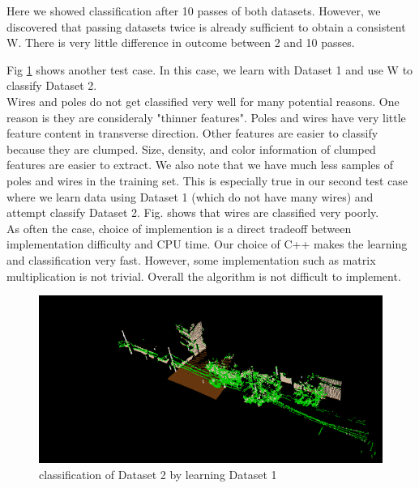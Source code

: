 \documentclass[letterpaper]{article}
\begin{document}
 Here we showed classification after 10 passes of both datasets. However, we discovered that passing datasets twice is already sufficient to obtain a consistent W. There is very little difference in outcome between 2 and 10 passes. 

\pagebreak

Fig \ref{fig:learned1_apply2} shows another test case. In this case, we learn with Dataset 1 and use W to classify Dataset 2.\\

Wires and poles do not get classified very well for many potential reasons. One reason is they are consideraly "thinner features". Poles and wires have very little feature content in transverse direction. Other features are easier to classify because they are clumped. Size, density, and color information of clumped features are easier to extract.  We also note that we have much less samples of poles and wires in the  training set. This is especially true in our second test case where we learn data using Dataset 1 (which do not have many wires) and attempt classify Dataset 2. Fig. shows that wires are classified very poorly. \\

As often the case, choice of implemention is a direct tradeoff between implementation difficulty and CPU time. Our choice of C++ makes the learning and classification very fast. However, some implementation such as matrix multiplication is not trivial. Overall the algorithm is not difficult to implement.

\begin{figure}[h]
  \centering
\includegraphics[scale = 0.4]{learned1_apply2}
\caption{classification of Dataset 2 by learning Dataset 1}
\label{fig:learned1_apply2}
\end{figure}
\end{document}
